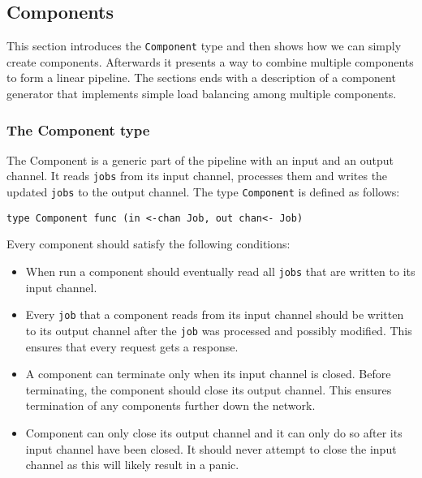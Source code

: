 \subsection{Components}
This section introduces the \texttt{Component} type and then shows how we can simply
create components. Afterwards it presents a way to combine multiple components
to form a linear pipeline. The sections ends with a description
of a component generator that implements simple load balancing among
multiple components.

\subsubsection{The Component type}
The Component is a generic part of the pipeline with an input and 
an output channel. It reads \texttt{jobs} from its input channel, 
processes them and writes the updated \texttt{jobs} to the output 
channel. The type \texttt{Component} is defined as follows:
\begin{lstlisting}
type Component func (in <-chan Job, out chan<- Job)
\end{lstlisting}
Every component should satisfy the following conditions:
\begin{itemize}
    \item When run a component should eventually read all \texttt{jobs} that are
          written to its input channel.

    \item Every \texttt{job} that a component reads from its input channel
          should be written to its output channel after the \texttt{job} was processed
          and possibly modified. This ensures that every request gets a response.

    \item A component can terminate only when its input channel is closed. 
          Before terminating, the component should close its output channel.
          This ensures termination of any components further down the network.

    \item Component can only close its output channel and it can only do so
    	  after its input channel have been closed. It should never attempt
          to close the input channel as this will likely result in a panic.
\end{itemize}

